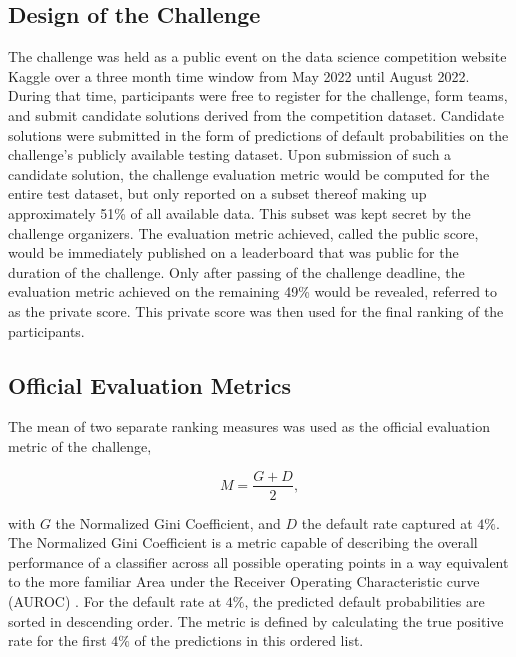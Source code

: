 \documentclass[runningheads]{llncs}
\begin{document}
\subsection{Design of the Challenge}
\label{sec:design-of-the-challenge}

The challenge was held as a public event on the data science competition website Kaggle over a three month time window from May 2022 until August 2022. During that time, participants were free to register for the challenge, form teams, and submit candidate solutions derived from the competition dataset. Candidate solutions were submitted in the form of predictions of default probabilities on the challenge's publicly available testing dataset. Upon submission of such a candidate solution, the challenge evaluation metric would be computed for the entire test dataset, but only reported on a subset thereof making up approximately 51\% of all available data. This subset was kept secret by the challenge organizers. The evaluation metric achieved, called the public score, would be immediately published on a leaderboard that was public for the duration of the challenge. Only after passing of the challenge deadline, the evaluation metric achieved on the remaining 49\% would be revealed, referred to as the private score. This private score was then used for the final ranking of the participants.

\subsection{Official Evaluation Metrics}
\label{sec:evaluation-metrics}

The mean of two separate ranking measures was used as the official evaluation metric of the challenge,

\begin{equation*}
    M = \dfrac{G+D}{2},
\end{equation*}

with $G$ the Normalized Gini Coefficient, and $D$ the default rate captured at $4\%$. The Normalized Gini Coefficient is a metric capable of describing the overall performance of a classifier across all possible operating points in a way equivalent to the more familiar Area under the Receiver Operating Characteristic curve (AUROC) \cite{schechtman2019relationship}. For the default rate at $4\%$, the predicted default probabilities are sorted in descending order. The metric is defined by calculating the true positive rate for the first $4\%$ of the predictions in this ordered list.
\end{document}
